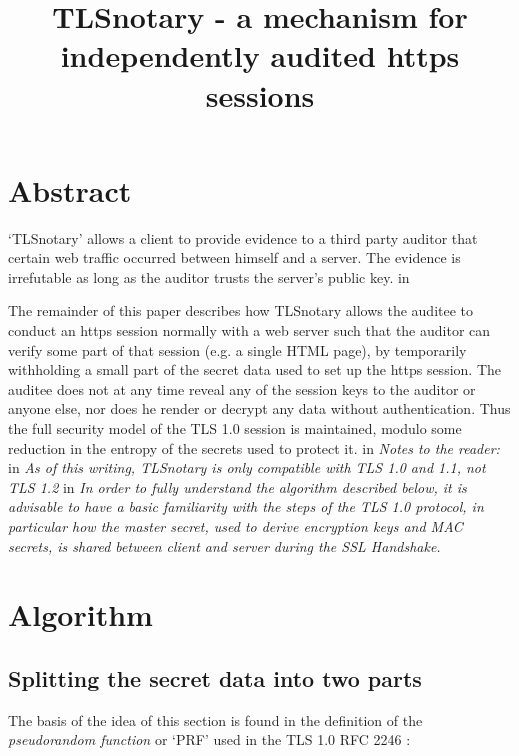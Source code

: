 \documentclass[10pt,a4paper]{article}
\begin{document}
\title{TLSnotary - a mechanism for independently audited https sessions}
\maketitle

\section{Abstract}

\noindent `TLSnotary' allows a client to provide evidence to a third party auditor that certain web traffic occurred between himself and a server. The evidence is irrefutable as long as the auditor trusts the server's public key.
 in

\noindent The remainder of this paper describes how TLSnotary allows the auditee to conduct an https session normally with a web server such that the auditor can verify some part of that session (e.g. a single HTML page), by temporarily withholding a small part of the secret data used to set up the https session. The auditee does not at any time reveal any of the session keys to the auditor or anyone else, nor does he render or decrypt any data without authentication. Thus the full security model of the TLS 1.0 session is maintained, modulo some reduction in the entropy of the secrets used to protect it.
 in
\noindent \textit{Notes to the reader:}
 in 
\noindent \textit{As of this writing, TLSnotary is only compatible with TLS 1.0 and 1.1, not TLS 1.2}
 in
\noindent \textit{In order to fully understand the algorithm described below, it is advisable to have a basic familiarity with the steps of the TLS 1.0 protocol, in particular how the master secret, used to derive encryption keys and MAC secrets, is shared between client and server during the SSL Handshake.}

\pagebreak

\section{Algorithm}

\subsection{Splitting the secret data into two parts}
\noindent The basis of the idea of this section is found in the definition of the \textit{pseudorandom function} or `PRF' used in the TLS 1.0 RFC 2246 \cite{TLS_spec}:
\end{document}
